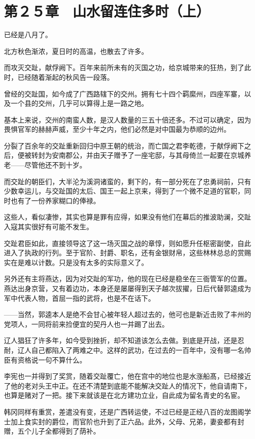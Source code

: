 \section{第２５章　山水留连住多时（上）}

已经是八月了。

北方秋色渐浓，夏日时的高温，也散去了许多。

而攻灭交趾，献俘阙下。百年来前所未有的灭国之功，给京城带来的狂热，到了此时，已经随着渐起的秋风告一段落。

曾经的交趾国，如今成了广西路辖下的交州。拥有七十四个羁縻州，四座军寨，以及一个县的交州，几乎可以算得上是一路之地。

基本上来说，交州的南蛮人数，是汉人数量的三五十倍还多。不过可以确定，因为畏惧官军的赫赫声威，至少十年之内，他们必然是对中国最为恭顺的边州。

分裂了百余年的交趾重新回归中原王朝的统治，而亡国之君李乾德，于献俘阙下之后，便被转封为安南郡公，并由天子赠予了一座宅邸，与其母倚兰一起要在京城养老——尽管他还不到十岁。

而交趾的朝臣们，大半沦为溪洞诸蛮的，剩下的，有一部分死在了忠勇祠前，只有少数幸运儿，与交趾国的太后、国王一起上京来，得到了一个微不足道的官职，同时也有了一份养家糊口的俸禄。

这些人，看似凄惨，其实也算是罪有应得，如果没有他们在幕后的推波助澜，交趾入寇其实很好有可能不发生。

交趾君臣如此，直接领导这了这一场灭国之战的章惇，则如愿升任枢密副使，自此进入了执政的行列。至于官阶、封爵、职名，还有金银财帛，这些林林总总的赏赐实在是难以计数。只是没有太多的实际意义了。

另外还有主将燕达，因为对交趾的军功，他的现在已经是稳坐在三衙管军的位置。燕达出身京营，又有着边功，本身还是屡屡得到天子越次拔擢，日后代替郭逵成为军中代表人物，首屈一指的武将，也是不在话下。

——当然，郭逵本人是绝不会甘心被年轻人超过去的，他可也是新近击败了丰州的党项人，一同将前来捡便宜的契丹人也一并踢了出去。

辽人猖狂了许多年，如今受到挫折，却不知道该怎么去做。到底是开战，还是忍耐，辽人自己都陷入了两难之中。这样的武功，在过去的一百年中，没有哪一名帅臣有资格说一句不算什么。

李宪也一并得到了奖赏，随着交趾覆亡，他在宫中的地位也是水涨船髙，已经接近了他的老对头王中正。在还不清楚到底能不能解决交趾人的情况下，他自请南下，也算是赌对了一把。接下来就该是在北方建功立业，自此成为留名青史的名宦。

韩冈同样有重赏，差遣没有变，还是广西转运使，不过已经是正经八百的龙图阁学士加上食实封的爵位，而官阶也升到了正六品。此外，父母、兄弟，妻妾都有封赠，五个儿子全都得到了荫补。

